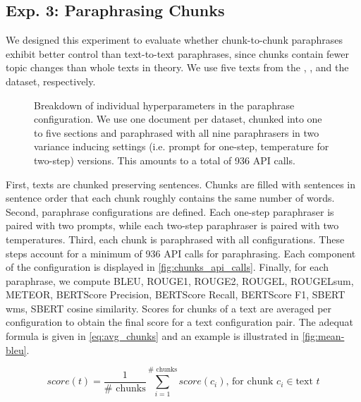 \subsection{Exp. 3: Paraphrasing Chunks}
\label{subsec:paraphrasing_chunks}

We designed this experiment to evaluate whether chunk-to-chunk paraphrases exhibit better control than text-to-text paraphrases, since chunks contain fewer topic changes than whole texts in theory.
We use five texts from the \dataBlog{}, \dataGutenberg{}, and the \dataStudent{} dataset, respectively.


\begin{figure}[htbp]
  \centering
  
  \caption{Breakdown of individual hyperparameters in the paraphrase configuration.
  We use one document per dataset, chunked into one to five sections and paraphrased with all nine paraphrasers in two variance inducing settings (i.e. prompt for one-step, temperature for two-step) versions.
  This amounts to a total of 936 API calls. 
  }
  \label{fig:chunks_api_calls}
\end{figure}


First, texts are chunked preserving sentences.
Chunks are filled with sentences in sentence order that each chunk roughly contains the same number of words.
Second, paraphrase configurations are defined.
Each one-step paraphraser is paired with two prompts, while each two-step paraphraser is paired with two temperatures.
Third, each chunk is paraphrased with all configurations.
These steps account for a minimum of 936 API calls for paraphrasing.
Each component of the configuration is displayed in \autoref{fig:chunks_api_calls}.
Finally, for each paraphrase, we compute BLEU, ROUGE1, ROUGE2, ROUGEL, ROUGELsum, METEOR, BERTScore Precision, BERTScore Recall, BERTScore F1, SBERT \ac{wms}, SBERT cosine similarity.
Scores for chunks of a text are averaged per configuration to obtain the final score for a text configuration pair.
The adequat formula is given in \autoref{eq:avg_chunks} and an example is illustrated in \autoref{fig:mean-bleu}.

\begin{equation}
    score(t) = \frac{1}{\#\text{ chunks}}\sum_{i=1}^{\#\text{ chunks}}score(c_i)\text{, for chunk }c_i \in \text{text }t
\label{eq:avg_chunks}
\end{equation}

